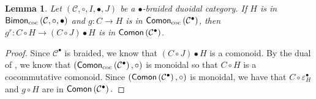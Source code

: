 \documentclass[nosumlimits,twoside]{amsart}
\newtheorem{lemma}[lemma]{\sc Lemma}
\theoremstyle{definition}
\theoremstyle{remark}
\newcommand{\Cc}{\mathcal{C}}
\def\Comon{{\sf Comon}}
\def\cBimon{{\sf Bimon}_{\mathrm{coc}}}
\def\cComon{{\sf Comon}_{\mathrm{coc}}}
\begin{document}
\begin{lemma}
\label{lem:grcomon}
Let $\left( \mathcal{C},\circ ,I,\bullet ,J\right) $ be a $\bullet $-braided duoidal
category. If $H$ is in $\cBimon\left( \mathcal{C,\circ, \bullet }\right) $ and $g:C\rightarrow H$ is in $\cComon\left( \mathcal{C}%
^{\bullet }\right) $, then $g^{r}:C\circ H\rightarrow \left( C\circ J\right)
\bullet H$ is in $\Comon\left( \mathcal{C}^{\bullet }\right) $.
\end{lemma}

\begin{proof}
Since $\mathcal{C}^{\bullet }$ is braided, we know that $\left( C\circ
J\right) \bullet H$ is a comonoid. By the dual of \cite[Proposition 6.37]{Aguiar}, we know that $\left( \cComon\left( \Cc^{\bullet }\right)
,\circ \right) $ is monoidal so that $C\circ H$ is a cocommutative comonoid.
Since $\left( \Comon\left( \mathcal{C}^{\bullet }\right) ,\circ \right) $ is
monoidal, we have that $C\circ \varepsilon _{H}^{\bullet }$ and $g\circ H$
are in $\Comon\left( \mathcal{C}^{\bullet }\right) .$ 


\end{proof}
\end{document}
